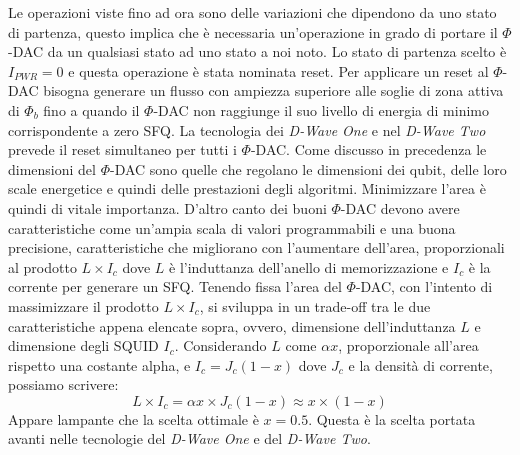 Le operazioni viste fino ad ora sono delle variazioni che dipendono da uno stato di partenza, questo implica che è necessaria un'operazione in grado di portare il $\Phi$-DAC da un qualsiasi stato ad uno stato a noi noto. Lo stato di partenza scelto è $I_{PWR} = 0$ e questa operazione è stata nominata reset. Per applicare un reset al $\Phi$-DAC bisogna generare un flusso con ampiezza superiore alle soglie di zona attiva di $\Phi_b$ fino a quando il $\Phi$-DAC non raggiunge il suo livello di energia di minimo corrispondente a zero SFQ. La tecnologia dei \textit{D-Wave One} e nel \textit{D-Wave Two} prevede il reset simultaneo per tutti i $\Phi$-DAC.
Come discusso in precedenza le dimensioni del $\Phi$-DAC sono quelle che regolano le dimensioni dei qubit, delle loro scale energetice e quindi delle prestazioni degli algoritmi. Minimizzare l'area è quindi di vitale importanza. D'altro canto dei buoni $\Phi$-DAC devono avere caratteristiche come un'ampia scala di valori programmabili e una buona precisione, caratteristiche che migliorano con l'aumentare dell'area, proporzionali al prodotto $L \times I_c$ dove $L$ è l'induttanza dell'anello di memorizzazione e $I_c$ è la corrente per generare un SFQ. Tenendo fissa l'area del $\Phi$-DAC, con l'intento di massimizzare il prodotto $L \times I_c$, si sviluppa in un trade-off tra le due caratteristiche appena elencate sopra, ovvero, dimensione dell'induttanza $L$ e dimensione degli SQUID $I_c$. Considerando $L$ come $\alpha x$, proporzionale all'area rispetto una costante alpha, e $I_c = J_c (1-x)$ dove $J_c$ e la densità di corrente, possiamo scrivere:
$$ L \times I_c = \alpha x \times J_c (1-x) \approx x \times (1 - x)$$
Appare lampante che la scelta ottimale è $x = 0.5$. Questa è la scelta portata avanti nelle tecnologie del \textit{D-Wave One} e del \textit{D-Wave Two}.
